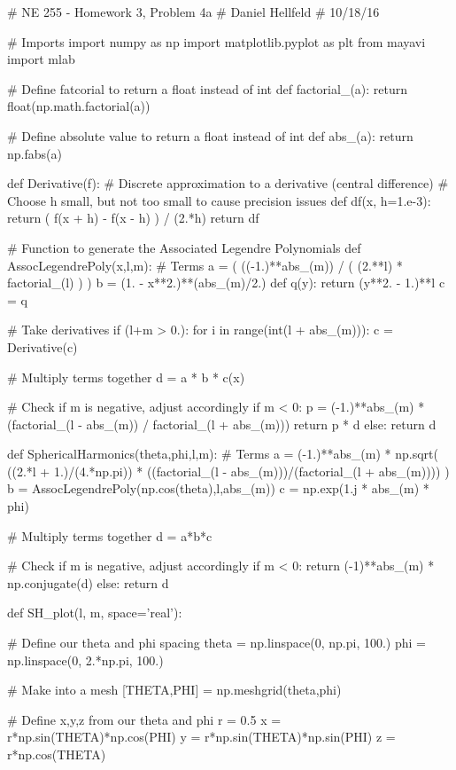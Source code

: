 # NE 255 - Homework 3, Problem 4a
# Daniel Hellfeld
# 10/18/16

# Imports
import numpy as np
import matplotlib.pyplot as plt
from mayavi import mlab

# Define fatcorial to return a float instead of int
def factorial_(a):
    return float(np.math.factorial(a))

# Define absolute value to return a float instead of int
def abs_(a):
    return np.fabs(a)

def Derivative(f):
    # Discrete approximation to a derivative (central difference)
    # Choose h small, but not too small to cause precision issues
    def df(x, h=1.e-3):
        return ( f(x + h) - f(x - h) ) / (2.*h)
    return df

# Function to generate the Associated Legendre Polynomials
def AssocLegendrePoly(x,l,m):
    # Terms
    a = ( ((-1.)**abs_(m)) / ( (2.**l) * factorial_(l) ) )
    b = (1. - x**2.)**(abs_(m)/2.)
    def q(y): return (y**2. - 1.)**l
    c = q

    # Take derivatives
    if (l+m > 0.):
        for i in range(int(l + abs_(m))):
            c = Derivative(c)

    # Multiply terms together
    d = a * b * c(x)

    # Check if m is negative, adjust accordingly
    if m < 0:
        p = (-1.)**abs_(m) * (factorial_(l - abs_(m)) / factorial_(l + abs_(m)))
        return p * d
    else:
        return d

def SphericalHarmonics(theta,phi,l,m):
    # Terms
    a = (-1.)**abs_(m) * np.sqrt( ((2.*l + 1.)/(4.*np.pi)) * ((factorial_(l - abs_(m)))/(factorial_(l + abs_(m)))) )
    b = AssocLegendrePoly(np.cos(theta),l,abs_(m))
    c = np.exp(1.j * abs_(m) * phi)

    # Multiply terms together
    d = a*b*c

    # Check if m is negative, adjust accordingly
    if m < 0:
        return (-1)**abs_(m) * np.conjugate(d)
    else:
        return d

def SH_plot(l, m, space='real'):

    # Define our theta and phi spacing
    theta = np.linspace(0, np.pi, 100.)
    phi = np.linspace(0, 2.*np.pi, 100.)

    # Make into a mesh
    [THETA,PHI] = np.meshgrid(theta,phi)

    # Define x,y,z from our theta and phi
    r = 0.5
    x = r*np.sin(THETA)*np.cos(PHI)
    y = r*np.sin(THETA)*np.sin(PHI)
    z = r*np.cos(THETA)

